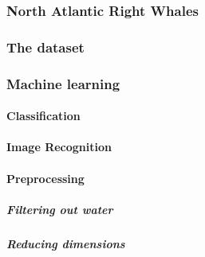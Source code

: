 \subsubsection{North Atlantic Right Whales}

\subsubsection{The dataset}


\subsubsection{Machine learning}
\paragraph{Classification}

\paragraph{Image Recognition}

\paragraph{Preprocessing}

\subparagraph{Filtering out water}
\subparagraph{Reducing dimensions}